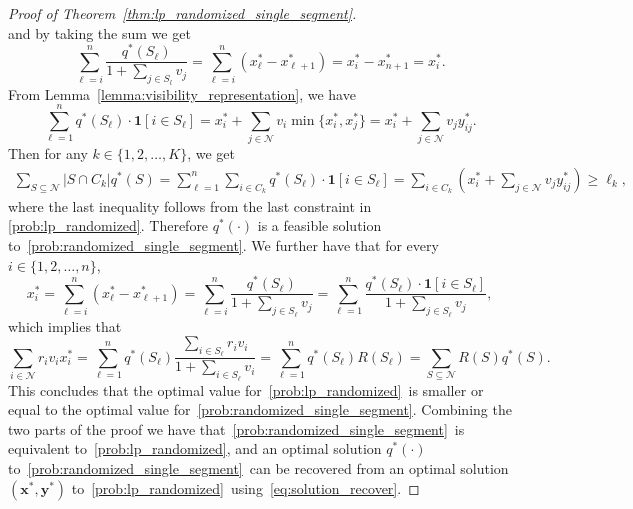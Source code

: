 \documentclass[msom,non-blindrev]{informs3} %
\theoremstyle{definition}
\begin{document}
\begin{proof}[Proof of Theorem~\ref{thm:lp_randomized_single_segment}]
\begin{equation*}
\end{equation*}
and by taking the sum we get
\begin{equation*}
\sum_{\ell=i}^n\dfrac{q^*(S_\ell)}{1+\sum_{j\in S_l}v_j}=\sum_{\ell=i}^n (x^*_\ell-x^*_{\ell+1})=x^*_i-x^*_{n+1}=x^*_i.
\end{equation*}
From Lemma~\ref{lemma:visibility_representation}, we have 
\begin{equation*}
\sum_{\ell=1}^n q^*(S_\ell)\cdot \bm{1}[i\in S_\ell]=x^*_i+\sum_{j\in\mathcal{N}}v_i\min\{x^*_i,x^*_j\}=x^*_i+\sum_{j\in\mathcal{N}}v_jy^*_{ij}.
\end{equation*}
Then for any $k\in\{1,2,\dots,K\}$, we get
\begin{align*}
\sum_{S\subseteq\mathcal{N}}|S\cap C_k|q^*(S)=\sum_{\ell=1}^n \sum_{i\in C_k}q^*(S_\ell)\cdot \bm{1}[i\in S_\ell]
=\sum_{i\in C_k}\left(x^*_i+\sum_{j\in\mathcal{N}}v_jy^*_{ij}\right)\geq \ell_k,
\end{align*}
where the last inequality follows from the last constraint in \eqref{prob:lp_randomized}. Therefore $q^*(\cdot)$ is a feasible solution to~\eqref{prob:randomized_single_segment}. We further have that for every $i\in\{1,2,\dots,n\}$,
\begin{equation*}
x^*_i=\sum_{\ell=i}^n (x^*_\ell-x^*_{\ell+1})=\sum_{\ell=i}^n \dfrac{q^*(S_\ell)}{1+\sum_{j\in S_\ell}v_j}=\sum_{\ell=1}^n\dfrac{q^*(S_\ell)\cdot\bm{1}[i\in S_\ell]}{1+\sum_{j\in S_\ell}v_j},
\end{equation*}
which implies that
\begin{equation*}
\sum_{i\in\mathcal{N}}r_iv_ix^*_i=\sum_{\ell=1}^n q^*(S_\ell)\dfrac{\sum_{i\in S_\ell}r_iv_i}{1+\sum_{i\in S_\ell}v_i}=\sum_{\ell=1}^n q^*(S_\ell)R(S_\ell)=\sum_{S\subseteq\mathcal{N}}R(S)q^*(S).
\end{equation*}
This concludes that the optimal value for~\eqref{prob:lp_randomized}~is smaller or equal to the optimal value for~\eqref{prob:randomized_single_segment}. Combining the two parts of the proof we have that~\eqref{prob:randomized_single_segment}~is equivalent to~\eqref{prob:lp_randomized}, and an optimal solution $q^*(\cdot)$ to~\eqref{prob:randomized_single_segment}~can be recovered from an optimal solution $(\mathbf{x}^*,\mathbf{y}^*)$ to~\eqref{prob:lp_randomized}~using~\eqref{eq:solution_recover}.
\end{proof}
\end{document}
